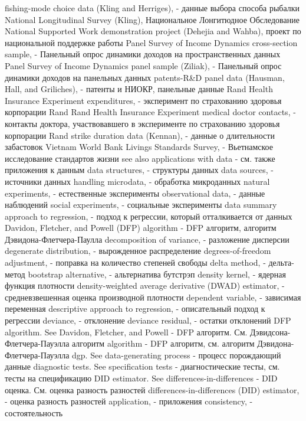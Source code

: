 fishing-mode choice data (Kling and Herriges), - данные выбора способа рыбалки
National Longitudinal Survey (Kling), Национальное Лонгитюдное Обследование
National Supported Work demonstration project (Dehejia and Wahba), проект по национальной поддержке работы
Panel Survey of Income Dynamics cross-section sample, - Панельный опрос динамики доходов на пространственных данных
Panel Survey of Income Dynamics panel sample (Ziliak), - Панельный опрос динамики доходов на панельных данных
patents-R&D panel data (Hausman, Hall, and Griliches), - патенты и НИОКР, панельные данные
Rand Health Insurance Experiment expenditures, - эксперимент по страхованию здоровья корпорации Rand
Rand Health Insurance Experiment medical doctor contacts, - контакты доктора, участвовавшего в эксперименте по страхованию здоровья корпорации Rand
strike duration data (Kennan), - данные о длительности забастовок
Vietnam World Bank Livings Standards Survey, - Вьетнамское исследование стандартов жизни
see also applications with data - см. также приложения к данным
data structures, - структуры данных
data sources, - источники данных
handling microdata, - обработка микроданных
natural experiments, - естественные эксперименты 
observational data, - данные наблюдений
social experiments, - социальные эксперименты
data summary approach to regression, - подход к регрессии, который отталкивается от данных
Davidon, Fletcher, and Powell (DFP) algorithm - DFP алгоритм, алгоритм Дэвидона-Флетчера-Паулла
decomposition of variance, - разложение дисперсии
degenerate distribution, - вырожденное распределение
degrees-of-freedom adjustment, - поправка на количество степеней свободы
delta method, - дельта-метод
bootstrap alternative, - альтернатива бутстрэп
density kernel, - ядерная функция плотности
density-weighted average derivative (DWAD)
estimator, - средневзвешенная оценка производной плотности
dependent variable, - зависимая переменная
descriptive approach to regression, - описательный подход к регрессии
deviance, - отклонение
deviance residual, - остатки отклонений
DFP algorithm. See Davidon, Fletcher, and Powell - DFP алгоритм. См. Дэвидсона-Флетчера-Пауэлла алгоритм
algorithm - DFP алгоритм, см. алгоритм Дэвидона-Флетчера-Пауэлла
dgp. See data-generating process - процесс порождающий данные
diagnostic tests. See specification tests - диагностические тесты, см. тесты на спецификацию
DID estimator. See differences-in-differences - DID оценка. См. оценка разность разностей
differences-in-differences (DID) estimator, - оценка разность разностей
application, - приложения
consistency, - состоятельность
